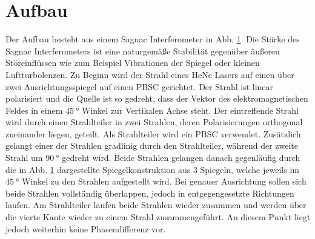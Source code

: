 \section{Aufbau}
Der Aufbau besteht aus einem Sagnac Interferometer in Abb. \ref{}. Die Stärke des Sagnac Interferometers ist eine naturgemäße Stabilität gegenüber äußeren Störeinflüssen wie zum Beispiel Vibrationen der Spiegel oder kleinen Luftturbolenzen. Zu Beginn wird der Strahl eines HeNe Lasers auf einen über zwei Ausrichtungsspiegel auf einen PBSC gerichtet. Der Strahl ist linear polarisiert und die Quelle ist so gedreht, dass der Vektor des elektromagnetischen Feldes in einem $\SI{45}{\degree}$ Winkel zur Vertikalen Achse steht. Der eintreffende Strahl wird durch einen Strahlteiler in zwei Strahlen, deren Polarisierungen orthogonal zueinander liegen, geteilt. Als Strahlteiler wird ein PBSC verwendet. Zusätzlich gelangt einer der Strahlen gradlinig durch den Strahlteiler, während der zweite Strahl um $\SI{90}{\degree}$ gedreht wird. Beide Strahlen gelangen danach gegenläufig durch die in Abb. \ref{} dargestellte Spiegelkonstruktion aus 3 Spiegeln, welche jeweils im $\SI{45}{\degree}$ Winkel zu den Strahlen aufgestellt wird. Bei genauer Ausrichtung sollen sich beide Strahlen vollständig überlappen, jedoch in entgegengesetzte Richtungen laufen. Am Strahlteiler laufen beide Strahlen wieder zusammen und werden über die vierte Kante wieder zu einem Strahl zusammengeführt. An diesem Punkt liegt jedoch weiterhin keine Phasendifferenz vor. 